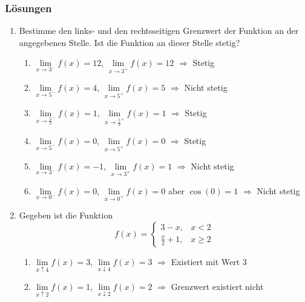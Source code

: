 \subsubsection*{Lösungen}
\begin{enumerate}
    \item Bestimme den links- und den rechtsseitigen Grenzwert der Funktion an der angegebenen Stelle. Ist die Funktion an dieser Stelle stetig?

          \begin{enumerate}
              \item $\lim\limits_{x \to 3^-} f(x) = 12$, \quad $\lim\limits_{x \to 3^+} f(x) = 12$ \newline $\Rightarrow$ Stetig
              \item $\lim\limits_{x \to 5^-} f(x) = 4$, \quad $\lim\limits_{x \to 5^+} f(x) = 5$ \newline $\Rightarrow$ Nicht stetig
              \item $\lim\limits_{x \to \frac{5}{2}^-} f(x) = 1$, \quad $\lim\limits_{x \to \frac{5}{2}^+} f(x) = 1$ \newline $\Rightarrow$  Stetig
              \item $\lim\limits_{x \to 5^-} f(x) = 0$, \quad $\lim\limits_{x \to 5^+} f(x) = 0$ \newline $\Rightarrow$ Stetig
              \item $\lim\limits_{x \to 3^-} f(x) = -1$, \quad $\lim\limits_{x \to 3^+} f(x) = 1$ \newline $\Rightarrow$ Nicht stetig
              \item $\lim\limits_{x \to 0^-} f(x) = 0$, \quad $\lim\limits_{x \to 0^+} f(x) = 0$ aber $\cos(0)=1$ \newline $\Rightarrow$ Nicht stetig
          \end{enumerate}

    \item Gegeben ist die Funktion
          \[
              f(x) = \begin{cases}
                  3-x,           & x<2     \\
                  \frac{x}{2}+1, & x\geq 2
              \end{cases}
          \]
          \begin{enumerate}
              \item $\lim\limits_{x \uparrow 4} f(x) = 3$, \quad $\lim\limits_{x \downarrow 4} f(x) = 3$ \newline $\Rightarrow$ Existiert mit Wert $3$
              \item $\lim\limits_{x \uparrow 2} f(x) = 1$, \quad $\lim\limits_{x \downarrow 2} f(x) = 2$ \newline $\Rightarrow$ Grenzwert existiert nicht
          \end{enumerate}
\end{enumerate}
\clearpage
